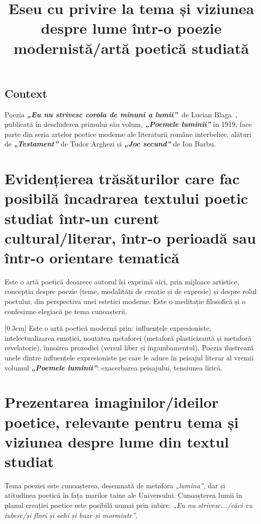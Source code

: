 \documentclass[
12pt,                        %
a4paper                      %
]{article}
\title{Eseu cu privire la tema și viziunea despre lume într-o poezie modernistă/artă poetică studiată}
\date{}   %
\author{} %
\newcommand{\operatitle}{\textbf{\textit{„Eu nu strivesc corola de minuni a lumii”\ }}} %
\newcommand{\operaauthor}{Lucian Blaga\ } %
\begin{document}
\maketitle %




\subsection{Context}

Poezia \operatitle de \operaauthor, publicată în deschiderea primului său volum, \textbf{\textit{„Poemele luminii”}} în 1919, face parte din seria artelor poetice moderne ale literaturii române interbelice, alături de \textbf{\textit{„Testament”}} de Tudor Arghezi și \textbf{\textit{„Joc secund”}} de Ion Barbu.

\section{Evidențierea trăsăturilor care fac posibilă încadrarea textului poetic studiat într-un curent cultural/literar, într-o perioadă sau într-o orientare tematică}

Este o artă poetică deoarece autorul își exprimă aici, prin mijloace artistice, con\-cep\-ți\-a despre poezie (teme, modalități de creație și de expresie) și despre rolul poetului, din perspectiva unei estetici moderne. Este o meditație filosofică și o confesiune elegiacă pe tema cunoașterii.

[0.3cm]
Este o artă poetică modernă prin: influențele expresioniste, intelectualizarea e\-mo\-ți\-ei, noutatea metaforei (metaforă plasticizantă și metaforă revelatorie), înnoirea prozodiei (versul liber și ingambamentul). Poezia ilustrează unele dintre influențele expresioniste pe care le aduce în peisajul literar al vremii volumul \textbf{\textit{„Poemele luminii”}}: exacerbarea peisajului, tensiunea lirică.

\section{Prezentarea imaginilor/ideilor poetice, relevante pentru tema și viziunea despre lume din textul studiat}

Tema poeziei este cunoașterea, desemnată de metafora \textit{„lumina”}, dar și atitudinea poetică în fața marilor taine ale Universului. Cunoașterea lumii în planul creației poetice este posibilă numai prin iubire: \textit{„Eu nu strivesc.../căci eu iubesc/și flori și ochi și buze și morminte”}.
\end{document}
